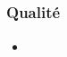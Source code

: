 \speaker{\Pierre}

\subsection{} %


\begin{frame}
\frametitle{Qualité}
\begin{itemize}
\item 
\end{itemize}
\end{frame}





